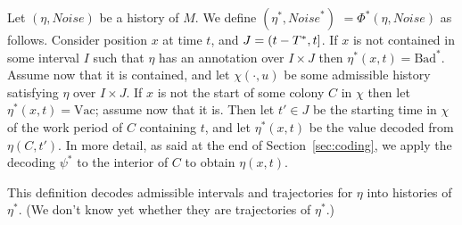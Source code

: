 \documentclass[11pt]{memoir}
\theoremstyle{definition} %
\renewcommand{\ge}{\geq}
\def\B{B}
\newcommand{\Noise}{\mathit{Noise}}
\newcommand{\Q}{Q} %
\newcommand{\Tu}{T}
\newcommand{\Tus}{T^{*}}
\newcommand{\Bad}{\mathrm{Bad}}
\newcommand{\Vacant}{\mathrm{Vac}}
\begin{document}
\begin{definition}[Scale-up]\label{def:scale-up}
Let \( (\eta,\Noise) \) be a history of \( M \).
We define \( (\eta^{*},\Noise^{*}) \) \( =\Phi^{*}(\eta,\Noise) \) as follows.
Consider position \( x \) at time \( t \), and \( J=\rint{t-\Tus}{t} \).
If \( x \) is not contained in some interval \( I \) such that \( \eta \) has an annotation
over \( I\times J \) then \( \eta^{*}(x,t)=\Bad^{*} \).
Assume now that it is contained, and let
\( \chi(\cdot,u) \) be some admissible history satisfying \( \eta \) over \( I\times J \).
If \( x \) is not the start of some colony \( C \) in \( \chi \)
then let \( \eta^{*}(x,t)=\Vacant \); assume now that it is.
Then let \( t'\in J \) be the starting time in \( \chi \) of the work period of \( C \)
containing \( t \), and let \( \eta^{*}(x,t) \) be the value decoded from \( \eta(C,t') \).
In more detail, as said at the end of Section~\ref{sec:coding}, we apply the decoding
\( \psi^{*} \) to the interior of \( C \) to obtain \( \eta(x,t) \).
\end{definition}

This definition decodes admissible intervals and trajectories for \( \eta \) into 
histories of \( \eta^{*} \).
(We don't know yet whether they are trajectories of \( \eta^{*} \).)




\end{document}
